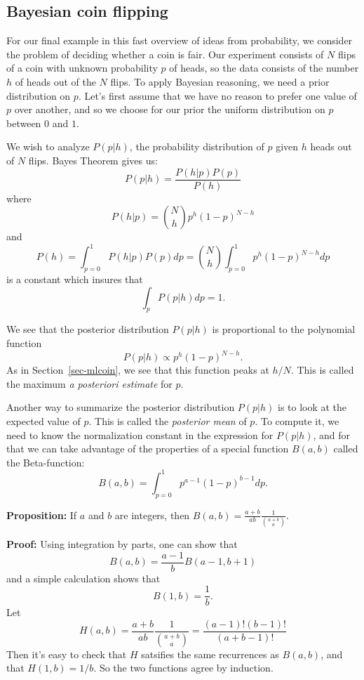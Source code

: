\documentclass[
  11pt,
  letterpaper,
]{scrbook}
\theoremstyle{plain}
\theoremstyle{plain}
\theoremstyle{remark}
\begin{document}
\hypertarget{bayesian-coin-flipping}{%
\subsection{Bayesian coin flipping}\label{bayesian-coin-flipping}}

For our final example in this fast overview of ideas from probability,
we consider the problem of deciding whether a coin is fair. Our
experiment consists of \(N\) flips of a coin with unknown probability
\(p\) of heads, so the data consists of the number \(h\) of heads out of
the \(N\) flips. To apply Bayesian reasoning, we need a prior
distribution on \(p\). Let's first assume that we have no reason to
prefer one value of \(p\) over another, and so we choose for our prior
the uniform distribution on \(p\) between \(0\) and \(1\).

We wish to analyze \(P(p|h)\), the probability distribution of \(p\)
given \(h\) heads out of \(N\) flips. Bayes Theorem gives us: \[
P(p|h) = \frac{P(h|p)P(p)}{P(h)}
\] where \[
P(h|p) = \binom{N}{h}p^{h}(1-p)^{N-h}
\] and \[
P(h)=\int_{p=0}^{1} P(h|p)P(p) dp = \binom{N}{h}\int_{p=0}^{1} p^{h}(1-p)^{N-h}dp
\] is a constant which insures that \[\int_{p}P(p|h)dp=1.\]

We see that the posterior distribution \(P(p|h)\) is proportional to the
polynomial function \[
P(p|h)\propto p^{h}(1-p)^{N-h}.
\] As in Section~\ref{sec-mlcoin}, we see that this function peaks at
\(h/N\). This is called the maximum \emph{a posteriori estimate} for
\(p\).

Another way to summarize the posterior distribution \(P(p|h)\) is to
look at the expected value of \(p\). This is called the \emph{posterior
mean} of \(p\). To compute it, we need to know the normalization
constant in the expression for \(P(p|h)\), and for that we can take
advantage of the properties of a special function \(B(a,b)\) called the
Beta-function: \[
B(a,b) = \int_{p=0}^{1} p^{a-1}(1-p)^{b-1} dp.
\]

\textbf{Proposition:} If \(a\) and \(b\) are integers, then
\(B(a,b)=\frac{a+b}{ab}\frac{1}{\binom{a+b}{a}}\).

\textbf{Proof:} Using integration by parts, one can show that \[
B(a,b)=\frac{a-1}{b}B(a-1,b+1)
\] and a simple calculation shows that \[
B(1,b) = \frac{1}{b}.
\] Let \[
H(a,b)=\frac{a+b}{ab}\frac{1}{\binom{a+b}{a}} = \frac{(a-1)!(b-1)!}{(a+b-1)!}
\] Then it's easy to check that \(H\) satsifies the same recurrences as
\(B(a,b)\), and that \(H(1,b)=1/b\). So the two functions agree by
induction.
\end{document}
